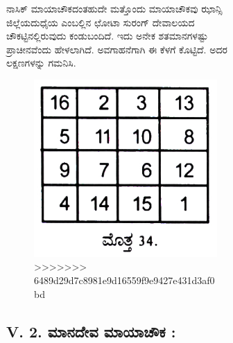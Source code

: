\begin{figure}[H]
\begin{figure}[H]
ನಾಸಿಕ್ ಮಾಯಾಚೌಕದಂತಹುದೇ ಮತ್ತೊಂದು ಮಾಯಾಚೌಕವು ಝಾನ್ಸಿ ಜಿಲ್ಲೆಯ\break ದುಧೈಯ ಎಂಬಲ್ಲಿನ ಛೋಟಾ ಸುರಂಗ್ ದೇವಾಲಯದ ಚೌಕಟ್ಟಿನಲ್ಲಿರುವುದು ಕಂಡು\break ಬಂದಿದೆ. ಇದು ಅನೇಕ ಶತಮಾನಗಳಷ್ಟು ಪ್ರಾಚೀನವೆಂದು ಹೇಳಲಾಗಿದೆ. ಅವಗಾಹನೆ\-ಗಾಗಿ ಈ ಕೆಳಗೆ ಕೊಟ್ಟಿದೆ. ಅದರ ಲಕ್ಷಣಗಳನ್ನು ಗಮನಿಸಿ.
\begin{figure}[H]
\includegraphics[scale=.8]{src/figures/chap4/fig4.7.jpg}
>>>>>>> 6489d29d7c8981e9d16559f9e9427e431d3af0bd
\end{figure}

\subsection*{V. 2. ಮಾನದೇವ ಮಾಯಾಚೌಕ :}


\end{figure}
\end{figure}
